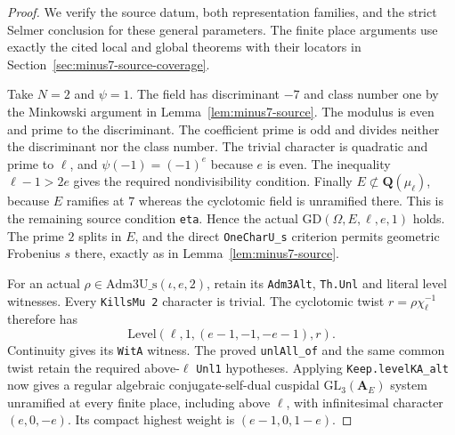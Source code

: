 \begin{proof}
We verify the source datum, both representation families, and the
strict Selmer conclusion for these general parameters. The finite
place arguments use exactly the cited local and global theorems
with their locators in Section~\ref{sec:minus7-source-coverage}.

Take $N=2$ and $\psi=1$. The field has discriminant $-7$ and class
number one by the Minkowski argument in Lemma~\ref{lem:minus7-source}.
The modulus is even and prime to the discriminant. The coefficient
prime is odd and divides neither the discriminant nor the class
number. The trivial character is quadratic and prime to $\ell$,
and $\psi(-1)=(-1)^e$ because $e$ is even. The inequality
$\ell-1>2e$ gives the required nondivisibility condition.
Finally $E\not\subset\mathbf Q(\mu_\ell)$, because $E$ ramifies
at $7$ whereas the cyclotomic field is unramified there. This is the
remaining source condition \texttt{eta}. Hence the actual
$\mathrm{GD}(\Omega,E,\ell,e,1)$ holds. The prime $2$ splits in
$E$, and the direct \texttt{OneCharU\_s} criterion permits geometric
Frobenius $s$ there, exactly as in Lemma~\ref{lem:minus7-source}.

For an actual $\rho\in\mathrm{Adm3U\_s}(\iota,e,2)$, retain its
\texttt{Adm3Alt}, \texttt{Th.Unl} and literal level witnesses.
Every \texttt{KillsMu 2} character is trivial. The cyclotomic twist
$r=\rho\chi_\ell^{-1}$ therefore has
\[
              \mathrm{Level}(\ell,1,(e-1,-1,-e-1),r).
\]
Continuity gives its \texttt{WitA} witness. The proved
\texttt{unlAll\_of} and the same common twist retain the required
above-$\ell$ \texttt{Unl1} hypotheses. Applying
\texttt{Keep.levelKA\_alt} now gives a regular algebraic
conjugate-self-dual cuspidal $\mathrm{GL}_3(\mathbf A_E)$ system
unramified at every finite place, including above $\ell$, with
infinitesimal character $(e,0,-e)$. Its compact highest weight is
$(e-1,0,1-e)$.


\end{proof}
